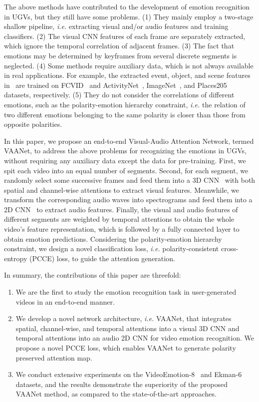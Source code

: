 \documentclass[letterpaper]{article} \usepackage{aaai20}  \usepackage{times}  \usepackage{helvet} \usepackage{courier}  \usepackage[hyphens]{url}  \usepackage{graphicx} \urlstyle{rm} \def\UrlFont{\rm}  \usepackage{graphicx}
\begin{document}
The above methods have contributed to the development of emotion recognition in UGVs, but they still have some problems. (1) They mainly employ a two-stage shallow pipeline, \textit{i.e.} extracting visual and/or audio features and training classifiers. (2) The visual CNN features of each frame are separately extracted, which ignore the temporal correlation of adjacent frames. (3) The fact that emotions may be determined by keyframes from several discrete segments is neglected. (4) Some methods require auxiliary data, which is not always available in real applications. For example, the extracted event, object, and scene features in~\cite{chen2016emotion} are trained on FCVID~\cite{jiang2017exploiting} and ActivityNet~\cite{caba2015activitynet}, ImageNet~\cite{deng2009imagenet}, and Places205~\cite{zhou2014learning} datasets, respectively. (5) They do not consider the correlations of different emotions, such as the polarity-emotion hierarchy constraint, \textit{i.e.} the relation of two different emotions belonging to the same polarity is closer than those from opposite polarities.


In this paper, we propose an end-to-end Visual-Audio Attention Network, termed VAANet, to address the above problems for recognizing the emotions in UGVs, without requiring any auxiliary data except the data for pre-training. First, we spit each video into an equal number of segments. Second, for each segment, we randomly select some successive frames and feed them into a 3D CNN~\cite{hara2018can} with both spatial and channel-wise
attentions to extract visual features. Meanwhile, we transform the corresponding audio waves into spectrograms and feed them into a 2D CNN~\cite{he2016deep} to extract audio features. Finally, the visual and audio features of different segments are weighted by temporal attentions to obtain the whole video's feature representation, which is followed by a fully connected layer to obtain emotion predictions. Considering the polarity-emotion hierarchy constraint, we design a novel classification loss, \textit{i.e.} polarity-consistent cross-entropy (PCCE) loss, to guide the attention generation.




In summary, the contributions of this paper are threefold:

\begin{enumerate}
\item We are the first to study the emotion recognition task in user-generated videos in an end-to-end manner.
\item We develop a novel network architecture, \textit{i.e.} VAANet, that integrates spatial, channel-wise, and temporal attentions into a visual 3D CNN and temporal attentions into an audio 2D CNN for video emotion recognition. We propose a novel PCCE loss, which enables VAANet to generate polarity preserved attention map.\item We conduct extensive experiments on the VideoEmotion-8~\cite{jiang2014predicting} and Ekman-6~\cite{xu2018heterogeneous} datasets, and the results demonstrate the superiority of the proposed VAANet method, as compared to the state-of-the-art approaches.
\end{enumerate}
\end{document}
